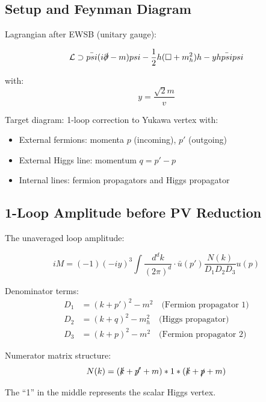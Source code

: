 \documentclass[12pt,a4paper]{report}
\begin{document}
	\subsection{Setup and Feynman Diagram}
	
	Lagrangian after EWSB (unitary gauge):
	
	\begin{equation}
		\mathcal{L} \supset \bar{\psi}(i\slashed{\partial} - m)\psi - \frac{1}{2}h(\Box + m_h^2)h - y h \bar{\psi}\psi
	\end{equation}
	
	with:
	\begin{equation}
		y = \frac{\sqrt{2} m}{v}
	\end{equation}
	
	Target diagram: 1-loop correction to Yukawa vertex with:
	\begin{itemize}
		\item External fermions: momenta $p$ (incoming), $p'$ (outgoing)
		\item External Higgs line: momentum $q = p' - p$
		\item Internal lines: fermion propagators and Higgs propagator
	\end{itemize}
	
	\subsection{1-Loop Amplitude before PV Reduction}
	
	The unaveraged loop amplitude:
	
	\begin{equation}
		iM = (-1)(-iy)^3 \int \frac{d^d k}{(2\pi)^d} \cdot \bar{u}(p') \frac{N(k)}{D_1 D_2 D_3} u(p)
	\end{equation}
	
	Denominator terms:
	\begin{align}
		D_1 &= (k + p')^2 - m^2 \quad \text{(Fermion propagator 1)}\\
		D_2 &= (k + q)^2 - m_h^2 \quad \text{(Higgs propagator)}\\
		D_3 &= (k + p)^2 - m^2 \quad \text{(Fermion propagator 2)}
	\end{align}
	
	Numerator matrix structure:
	\begin{equation}
		N(k) = (\slashed{k} + \slashed{p'} + m) \cdot 1 \cdot (\slashed{k} + \slashed{p} + m)
	\end{equation}
	
	The ``1'' in the middle represents the scalar Higgs vertex.
	
\end{document}
